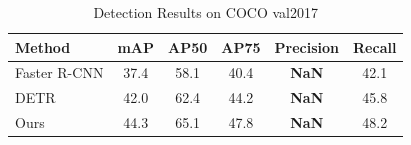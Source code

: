 \documentclass{article}
\begin{document}
\begin{table}[t]
\caption{Detection Results on COCO val2017}
\label{tab:results}
\centering
\begin{tabular}{lccccc}
\toprule
Method & mAP & AP50 & AP75 & Precision & Recall \\
\midrule
Faster R-CNN & 37.4 & 58.1 & 40.4 & \textbf{NaN} & 42.1 \\
DETR & 42.0 & 62.4 & 44.2 & \textbf{NaN} & 45.8 \\
Ours & 44.3 & 65.1 & 47.8 & \textbf{NaN} & 48.2 \\
\bottomrule
\end{tabular}
\end{table}
\end{document}
